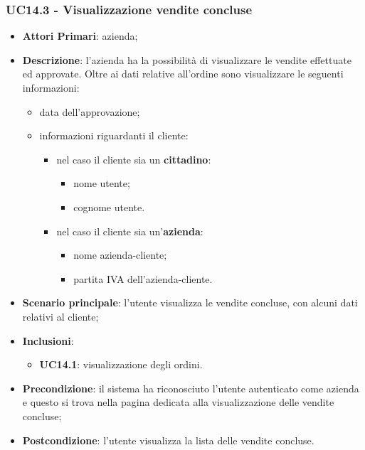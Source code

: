 \subsubsection{UC14.3 - Visualizzazione vendite concluse}
\begin{itemize}
	\item \textbf{Attori Primari}: azienda;
	\item \textbf{Descrizione}: l'azienda ha la possibilità di visualizzare le vendite effettuate ed approvate. Oltre ai dati relative all'ordine sono visualizzare le seguenti informazioni:
		\begin{itemize}
		\item data dell'approvazione;
		\item informazioni riguardanti il cliente:
		\begin{itemize}
			\item nel caso il cliente sia un \textbf{cittadino}:
			\begin{itemize}
				
				\item nome utente;
				\item cognome utente.
			\end{itemize}
			\item nel caso il cliente sia un'\textbf{azienda}:
			\begin{itemize}
				
				\item nome azienda-cliente;
				\item partita IVA dell'azienda-cliente.
			\end{itemize}
		\end{itemize}
		
	\end{itemize}
	\item \textbf{Scenario principale}:  l'utente visualizza le vendite concluse, con alcuni dati relativi al cliente; 
	\item \textbf{Inclusioni}:
	\begin{itemize}
		\item \textbf{UC14.1}: visualizzazione degli ordini.
	\end{itemize}
	\item \textbf{Precondizione}: il sistema ha riconosciuto l'utente autenticato come azienda e questo si trova nella pagina dedicata alla visualizzazione delle vendite concluse;
	\item \textbf{Postcondizione}: l'utente visualizza la lista delle vendite concluse.
\end{itemize}


